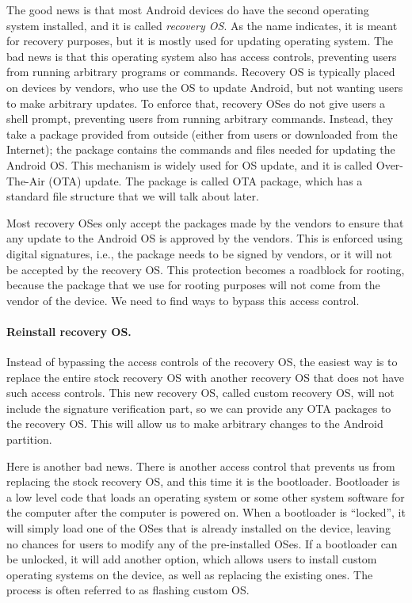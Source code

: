The good news is that most Android devices do have the second operating
system installed, and it is called \textit{recovery OS}. As the name
indicates, it is meant for recovery purposes, but it is mostly used for
updating operating system. The bad news is that this operating system also
has access controls, preventing users from running arbitrary programs or
commands. Recovery OS is typically placed on devices by vendors, who use 
the OS to update Android, but not wanting users to make arbitrary updates. 
To enforce that, recovery OSes do not give users a shell prompt, preventing
users from running arbitrary commands. Instead, they take a package provided
from outside (either from users or downloaded from the Internet); the
package contains the commands and files needed for updating the 
Android OS. This mechanism is widely
used for OS update, and it is called Over-The-Air (OTA) update. The package is
called OTA package, which has a standard file structure that we will
talk about later. 


Most recovery OSes only accept the packages made by the vendors to ensure
that any update to the Android OS is approved by the vendors. This is enforced
using digital signatures, i.e., the package needs to be signed by vendors,
or it will not be accepted by the recovery OS. This protection becomes a
roadblock for rooting, because the package that we use for rooting purposes
will not come from the vendor of the device. We need to find ways to bypass
this access control. 



\paragraph{Reinstall recovery OS.}
Instead of bypassing the access controls of the recovery OS, the easiest
way is to replace the entire stock recovery OS with another recovery OS
that does not have such access controls. This new recovery OS, called
custom recovery OS, will not include the signature
verification part, so we can provide any OTA packages to the recovery OS.
This will allow us to make arbitrary changes to the Android partition.

Here is another bad news. There is another access control that prevents us
from replacing the stock recovery OS, and this time it is the bootloader. 
Bootloader is a low level code that loads an operating system or some other
system software for the computer after the computer is powered on. When a
bootloader is ``locked'', it will simply load one of the OSes that is
already installed on the device, leaving no chances for users to modify any
of the pre-installed OSes. If a bootloader can be unlocked, it
will add another option, which allows users to install custom operating
systems on the device, as well as replacing the existing ones. The process
is often referred to as flashing custom OS. 


